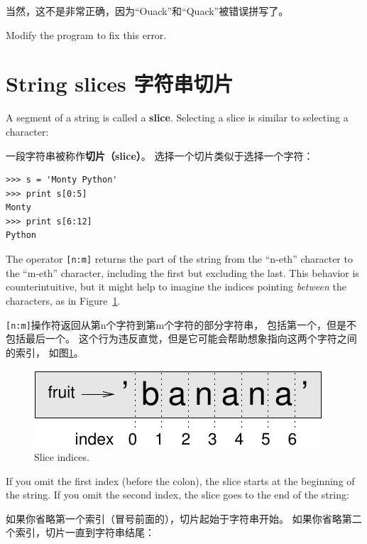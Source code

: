 \documentclass[10pt]{book}
\begin{document}
\begin{CJK}{UTF8}{gbsn}
当然，这不是非常正确，因为``Ouack''和``Quack''被错误拼写了。

\begin{exercise}

Modify the program to fix this error.

\end{exercise}



\section{String slices 字符串切片}
\label{slice}

A segment of a string is called a {\bf slice}.  Selecting a slice is
similar to selecting a character:

一段字符串被称作{\bf 切片（slice）}。
选择一个切片类似于选择一个字符：

\begin{verbatim}
>>> s = 'Monty Python'
>>> print s[0:5]
Monty
>>> print s[6:12]
Python
\end{verbatim}
%
The operator {\tt [n:m]} returns the part of the string from the 
``n-eth'' character to the ``m-eth'' character, including the first but
excluding the last.  This behavior is counterintuitive, but it might
help to imagine the indices pointing {\em between} the
characters, as in Figure~\ref{fig.banana}.

{\tt [n:m]}操作符返回从第n个字符到第m个字符的部分字符串，
包括第一个，但是不包括最后一个。
这个行为违反直觉，但是它可能会帮助想象指向这两个字符之间的索引，
如图\ref{fig.banana}。

\begin{figure}
\centerline
{\includegraphics[scale=0.8]{figs/banana.pdf}}
\caption{Slice indices.}
\label{fig.banana}
\end{figure}


If you omit the first index (before the colon), the slice starts at
the beginning of the string.  If you omit the second index, the slice
goes to the end of the string:

如果你省略第一个索引（冒号前面的），切片起始于字符串开始。
如果你省略第二个索引，切片一直到字符串结尾：


\end{CJK}
\end{document}

